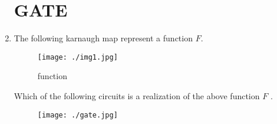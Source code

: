 \documentclass[12pt,-letter paper]{article}
\begin{document}
\begin{enumerate}
		\section*{\centering GATE}
	\item The following karnaugh map represent     a function $F$.
	\begin{figure}[!ht]
\texttt{[image: ./img1.jpg]}
\label{fig:fig1.0}
\caption{function}
\end{figure}
\newpage
Which of the following circuits is a realization of the above function $F$ .
\begin{figure}[!ht]
\texttt{[image: ./gate.jpg]}
\end{figure}
\end{enumerate}
\end{document}
